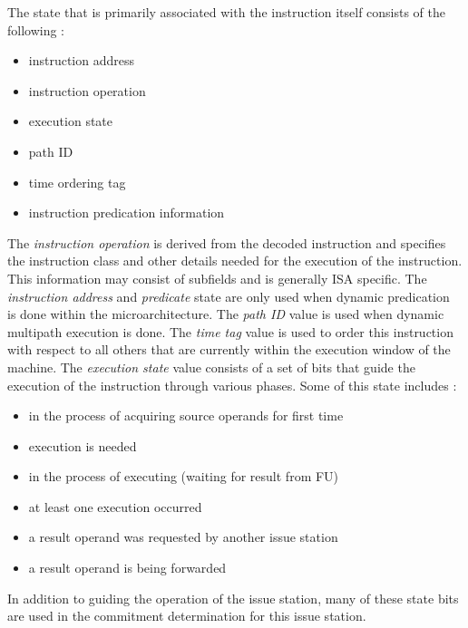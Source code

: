 \documentclass[10pt,dvips]{article}
\begin{document}
The state that is primarily associated with the instruction itself
consists of the following :
%
\begin{itemize}
\vspace{-0.10in}
\item{instruction address}
\vspace{-0.10in}
\item{instruction operation}
\vspace{-0.10in}
\item{execution state}
\vspace{-0.10in}
\item{path ID}
\vspace{-0.10in}
\item{time ordering tag}
\vspace{-0.10in}
\item{instruction predication information}
\vspace{-0.10in}
\end{itemize}   
%
The \textit{instruction operation} is derived from the decoded
instruction and specifies the instruction class and other
details needed for the execution of the instruction.
This information may consist of subfields and is generally ISA
specific.
The \textit{instruction address} and \textit{predicate} state
are only used when dynamic predication~\cite{morano02predication}
is done within the
microarchitecture.
The \textit{path ID} value is used when dynamic multipath
execution is done.
The \textit{time tag} value is used to order this instruction
with respect to all others that are currently within the execution
window of the machine.
The \textit{execution state} value consists of a set of
bits that guide the execution of the instruction through
various phases.  Some of this state includes :
%
\begin{itemize}
\vspace{-0.10in}
\item{in the process of acquiring source operands for first time}
\vspace{-0.10in}
\item{execution is needed}
\vspace{-0.10in}
\item{in the process of executing (waiting for result from FU)}
\vspace{-0.10in}
\item{at least one execution occurred}
\vspace{-0.10in}
\item{a result operand was requested by another issue station}
\vspace{-0.10in}
\item{a result operand is being forwarded}
\vspace{-0.10in}
\end{itemize}   
%
In addition to guiding the operation of the issue station,
many of these state bits are used in the commitment determination
for this issue station.
\end{document}
